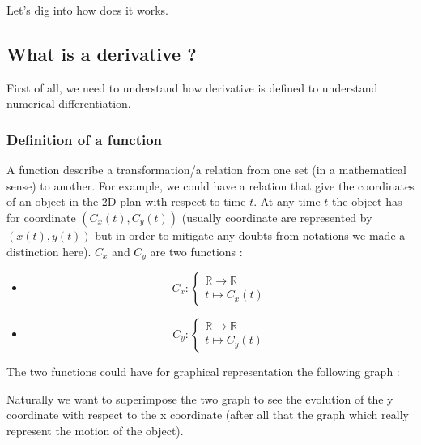 \documentclass[12pt]{article}
\begin{document}
Let's dig into how does it works.

\subsection{What is a derivative ?}

First of all, we need to understand how derivative is defined to understand numerical differentiation. 

\subsubsection{Definition of a function}

A function describe a transformation/a relation from one set (in a mathematical sense) to another. For example, we could have a relation that give the coordinates of an object in the 2D plan with respect to time $t$. At any time $t$ the object has for coordinate $(C_x(t), C_y(t))$ (usually coordinate are represented by $(x(t), y(t))$ but in order to mitigate any doubts from notations we made a distinction here). $C_x$ and $C_y$ are two functions :


\begin{itemize}
\item[]
$$
C_x: 
    \begin{cases}
        \mathbb{R} \rightarrow \mathbb{R} \\
        t \longmapsto C_x(t)
    \end{cases}
$$

\item[]
$$
C_y: 
    \begin{cases}
        \mathbb{R} \rightarrow \mathbb{R} \\
        t \longmapsto C_y(t)
    \end{cases}
$$
\end{itemize}



The two functions could have for graphical representation the following graph : 


\begin{figure}[H]
 \centering
 
\end{figure}

Naturally we want to superimpose the two graph to see the evolution of the y coordinate with respect to the x coordinate (after all that the graph which really represent the motion of the object). 
\end{document}
